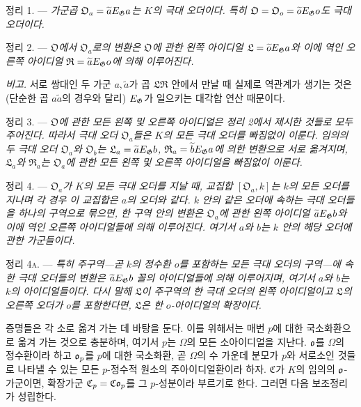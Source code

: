 \medskip
\noindent\textsc{정리 1. ---} \emph{가군곱 $\mathfrak O_a=\widetilde aE_\mathfrak G a$는 $K$의 극대 오더이다. 특히 $\mathfrak O=\mathfrak O_o=\widetilde oE_\mathfrak G o$도 극대 오더이다.}

\medskip
\noindent\textsc{정리 2. ---} \emph{$\mathfrak O$에서 $\mathfrak O_a$로의 변환은 $\mathfrak O$에 관한 왼쪽 아이디얼 $\mathfrak L=\widetilde oE_\mathfrak G a$와 이에 역인 오른쪽 아이디얼 $\mathfrak R=\widetilde aE_\mathfrak G o$에 의해 이루어진다.}

\emph{비고.} 서로 쌍대인 두 가군 $a,\widetilde a$가 곱 $\mathfrak L\mathfrak R$ 안에서 만날 때 실제로 역관계가 생기는 것은 (단순한 곱 $a\widetilde a$의 경우와 달리) $E_\mathfrak G$가 일으키는 대각합 연산 때문이다.

\medskip
\noindent\textsc{정리 3. ---} \emph{$\mathfrak O$에 관한 모든 왼쪽 및 오른쪽 아이디얼은 정리 2에서 제시한 것들로 모두 주어진다. 따라서 극대 오더 $\mathfrak O_a$들은 $K$의 모든 극대 오더를 빠짐없이 이룬다. 임의의 두 극대 오더 $\mathfrak O_a$와 $\mathfrak O_b$는 $\mathfrak L_a=\widetilde aE_\mathfrak G b$, $\mathfrak R_a=\widetilde bE_\mathfrak G a$에 의한 변환으로 서로 옮겨지며, $\mathfrak L_a$와 $\mathfrak R_a$는 $\mathfrak O_a$에 관한 모든 왼쪽 및 오른쪽 아이디얼을 빠짐없이 이룬다.}

\medskip
\noindent\textsc{정리 4. ---} \emph{$\mathfrak O_a$가 $K$의 모든 극대 오더를 지날 때, 교집합 $[\mathfrak O_a,k]$는 $k$의 모든 오더를 지나며 각 경우 이 교집합은 $a$의 오더와 같다. $k$ 안의 같은 오더에 속하는 극대 오더들을 하나의 구역으로 묶으면, 한 구역 안의 변환은 $\mathfrak O_a$에 관한 왼쪽 아이디얼 $\widetilde aE_\mathfrak G b$와 이에 역인 오른쪽 아이디얼들에 의해 이루어진다. 여기서 $a$와 $b$는 $k$ 안의 해당 오더에 관한 가군들이다.}

\medskip
\noindent\textsc{정리 4a. ---} \emph{특히 주구역---곧 $k$의 정수환 $o$를 포함하는 모든 극대 오더의 구역---에 속한 극대 오더들의 변환은 $\widetilde aE_\mathfrak G b$ 꼴의 아이디얼들에 의해 이루어지며, 여기서 $a$와 $b$는 $k$의 아이디얼들이다. 다시 말해 $\mathfrak L$이 주구역의 한 극대 오더의 왼쪽 아이디얼이고 $\mathfrak L$의 오른쪽 오더가 $o$를 포함한다면, $\mathfrak L$은 한 $o$-아이디얼의 확장이다.}

증명들은 각 소로 옮겨 가는 데 바탕을 둔다. 이를 위해서는 매번 $p$에 대한 국소화환으로 옮겨 가는 것으로 충분하며, 여기서 $p$는 $\Omega$의 모든 소아이디얼을 지난다. $\mathfrak o$를 $\Omega$의 정수환이라 하고 $\mathfrak o_p$를 $p$에 대한 국소화환, 곧 $\Omega$의 수 가운데 분모가 $p$와 서로소인 것들로 나타낼 수 있는 모든 $p$-정수적 원소의 주아이디얼환이라 하자. $\mathfrak C$가 $K$의 임의의 $\mathfrak o$-가군이면, 확장가군 $\mathfrak C_p=\mathfrak C\mathfrak o_p$를 그 $p$-성분이라 부르기로 한다. 그러면 다음 보조정리가 성립한다.

